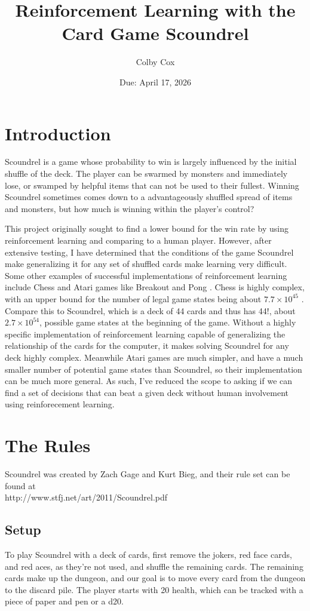 \documentclass{article}
\title{Reinforcement Learning with the Card Game Scoundrel}
\author{Colby Cox}
\date{Due: April 17, 2026}
\begin{document}
\maketitle

\section{Introduction}
Scoundrel is a game whose probability to win is largely influenced by the initial shuffle of the deck. The player can be swarmed by monsters and immediately lose, or swamped by helpful items that can not be used to their fullest. Winning Scoundrel sometimes comes down to a advantageously shuffled spread of items and monsters, but how much is winning within the player's control?

This project originally sought to find a lower bound for the win rate by using reinforcement learning and comparing to a human player. However, after extensive testing, I have determined that the conditions of the game Scoundrel make generalizing it for any set of shuffled cards make learning very difficult. Some other examples of successful implementations of reinforcement learning include Chess and Atari games like Breakout and Pong \cite{mnih_playing_2013}. Chess is highly complex, with an upper bound for the number of legal game states being about $7.7 \times 10^{45}$ \cite{tromp_chess_2026} . Compare this to Scoundrel, which is a deck of 44 cards and thus has 44!, about $2.7 \times 10^{54}$, possible game states at the beginning of the game. Without a highly specific implementation of reinforcement learning capable of generalizing the relationship of the cards for the computer, it makes solving Scoundrel for any deck highly complex. Meanwhile Atari games are much simpler, and have a much smaller number of potential game states than Scoundrel, so their implementation can be much more general. As such, I've reduced the scope to asking if we can find a set of decisions that can beat a given deck without human involvement using reinforecement learning.

\section{The Rules}
Scoundrel was created by Zach Gage and Kurt Bieg, and their rule set can be found at \\ http://www.stfj.net/art/2011/Scoundrel.pdf \cite{Rules}

\subsection{Setup}
To play Scoundrel with a deck of cards, first remove the jokers, red face cards, and red aces, as they're not used, and shuffle the remaining cards. The remaining cards make up the dungeon, and our goal is to move every card from the dungeon to the discard pile. The player starts with 20 health, which can be tracked with a piece of paper and pen or a d20.
\end{document}
